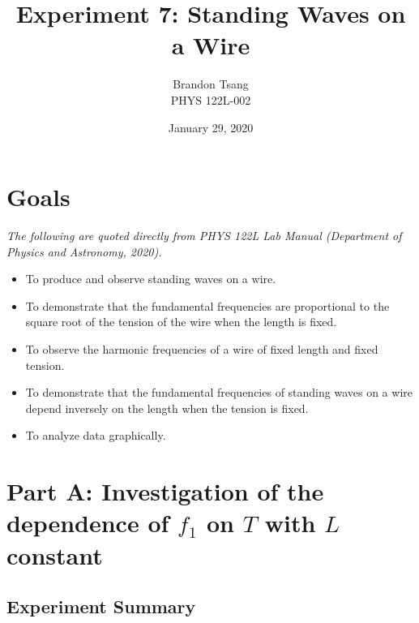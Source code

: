 \documentclass[11pt]{article}
\title{Experiment 7: Standing Waves on a Wire}
\author{
    Brandon Tsang \\
    PHYS 122L-002
}
\date{January 29, 2020}
\begin{document}
\maketitle
\section*{Goals}
    \textit{The following are quoted directly from PHYS 122L Lab Manual (Department of Physics and Astronomy, 2020).}
    \begin{itemize}
        \item To produce and observe standing waves on a wire.
        \item To demonstrate that the fundamental frequencies are proportional to the square root of the tension of the wire when the length is fixed.
        \item To observe the harmonic frequencies of a wire of fixed length and fixed tension.
        \item To demonstrate that the fundamental frequencies of standing waves on a wire depend inversely on the length when the tension is fixed.
        \item To analyze data graphically.
    \end{itemize}
\section*{\boldmath Part A: Investigation of the dependence of $f_1$ on $T$ with $L$ constant}
    \subsection*{Experiment Summary}
        
\end{document}
